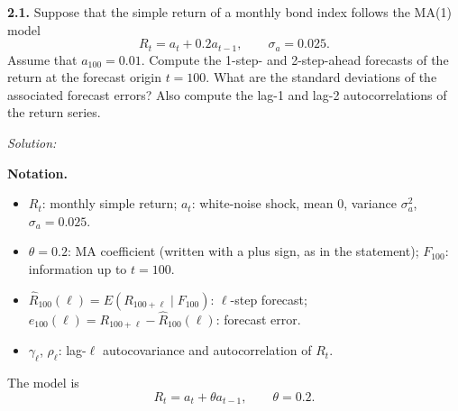 \documentclass[11pt,a4paper]{article}
\newif\ifsolucoes
\newcommand{\espacoresol}{4.5cm}   %
\newenvironment{notacao}{\par\smallskip\noindent\textbf{Notation.}\begin{itemize}[leftmargin=1.4em,topsep=1pt,itemsep=0pt]\small}{\end{itemize}}
\newcommand{\resolespaco}{\ifsolucoes\else\par\textit{Solution:}\vspace{\espacoresol}\par\fi}
\begin{document}
\noindent\textbf{2.1.} Suppose that the simple return of a monthly bond index follows the MA(1) model
\[ R_t = a_t + 0.2a_{t-1}, \qquad \sigma_a = 0.025. \]
Assume that $a_{100} = 0.01$. Compute the 1-step- and 2-step-ahead forecasts of the return at the forecast
origin $t = 100$. What are the standard deviations of the associated forecast errors? Also compute the lag-1
and lag-2 autocorrelations of the return series.
\resolespaco
\begin{sol}
\begin{notacao}
\item $R_t$: monthly simple return; $a_t$: white-noise shock, mean $0$, variance $\sigma_a^2$, $\sigma_a=0.025$.
\item $\theta=0.2$: MA coefficient (written with a plus sign, as in the statement); $F_{100}$: information up to $t=100$.
\item $\hat R_{100}(\ell)=E(R_{100+\ell}\mid F_{100})$: $\ell$-step forecast; $e_{100}(\ell)=R_{100+\ell}-\hat R_{100}(\ell)$: forecast error.
\item $\gamma_\ell$, $\rho_\ell$: lag-$\ell$ autocovariance and autocorrelation of $R_t$.
\end{notacao}

\noindent The model is
\begin{equation}\label{q21:model} R_t = a_t + \theta a_{t-1}, \qquad \theta = 0.2 . \end{equation}


\end{sol}
\end{document}
